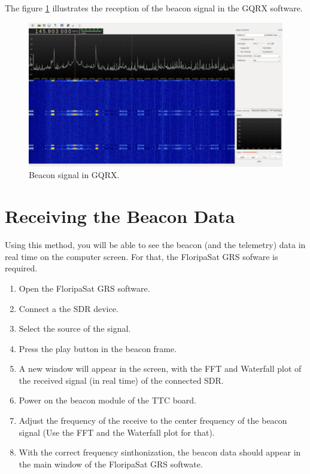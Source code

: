 \documentclass[12pt]{book}
\begin{document}
\begin{appendices}
The figure \ref{fig:beacon-signal-gqrx} illustrates the reception of the beacon signal in the GQRX software.

\begin{figure}[!h]
	\begin{center}
		\includegraphics[width=\textwidth]{figures/beacon-signal-gqrx.png}
		\caption{Beacon signal in GQRX.}
		\label{fig:beacon-signal-gqrx}
	\end{center}
\end{figure}

\section{Receiving the Beacon Data}

Using this method, you will be able to see the beacon (and the telemetry) data in real time on the computer screen. For that, the FloripaSat GRS sofware is required.

\begin{enumerate}
    \item Open the FloripaSat GRS software.
    \item Connect a the SDR device.
    \item Select the source of the signal.
    \item Press the play button in the beacon frame.
    \item A new window will appear in the screen, with the FFT and Waterfall plot of the received signal (in real time) of the connected SDR.
    \item Power on the beacon module of the TTC board.
    \item Adjust the frequency of the receive to the center frequency of the beacon signal (Use the FFT and the Waterfall plot for that).
    \item With the correct frequency sinthonization, the beacon data should appear in the main window of the FloripaSat GRS softwate.
\end{enumerate}


\end{appendices}
\end{document}
